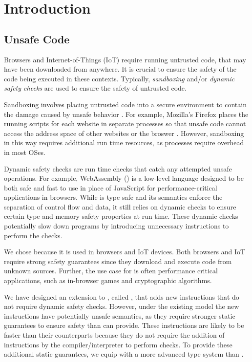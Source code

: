 \chapter{Introduction}
\label{chp:intro}

\section{Unsafe Code}
Browsers and Internet-of-Things (IoT) require running untrusted code, that may have been downloaded from anywhere.
It is crucial to ensure the safety of the code being executed in these contexts.
Typically, \emph{sandboxing} and/or \emph{dynamic safety checks} are used to ensure the safety of untrusted code.

Sandboxing involves placing untrusted code into a secure environment to contain the damage caused by unsafe behavior \cite{sandboxes}.
For example, Mozilla's Firefox places the running scripts for each website in separate processes so that unsafe code cannot access the address space of other websites or the broswer \cite{foxbox}.
However, sandboxing in this way requires additional run time resources, as processes require overhead in most OSes.

Dynamic safety checks are run time checks that catch any attempted unsafe operations.
For example, WebAssembly (\wasm) is a low-level language designed to be both safe and fast to use in place of JavaScript for performance-critical applications in browsers.
While \wasm is type safe and its semantics enforce the separation of control flow and data, it still relies on dynamic checks to ensure certain type and memory safety properties at run time.
These dynamic checks potentially slow down programs by introducing unnecessary instructions to perform the checks.

We chose \wasm because it is used in browsers and IoT devices.
Both browsers and IoT require strong safety guarantees since they download and execute code from unknown sources.
Further, the use case for \wasm is often performance critical applications, such as in-browser games and cryptographic algorithms.

We have designed an extension to \wasm, called \name, that adds new instructions that do not require dynamic safety checks.
However, under the existing \wasm model the new \name instructions have potentially unsafe semantics, as they require stronger static guarantees to ensure safety than \wasm can provide.
These instructions are likely to be faster than their \wasm counterparts because they do not require the addition of instructions by the compiler/interpreter to perform checks.
To provide these additional static guarantees, we equip \name with a more advanced type system than \wasm.

